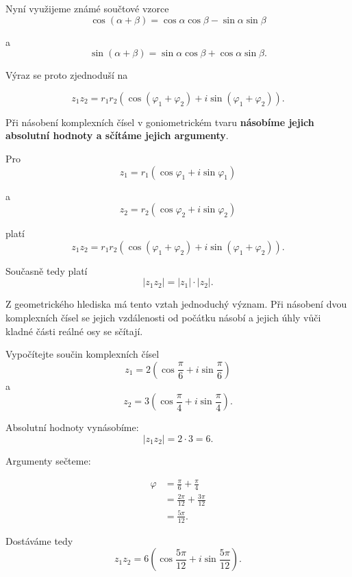 \documentclass[12pt,a4paper]{article}
\begin{document}
Nyní využijeme známé součtové vzorce
\[
    \cos(\alpha+\beta) = \cos\alpha\cos\beta - \sin\alpha\sin\beta
\]

a
\[
    \sin(\alpha+\beta) = \sin\alpha\cos\beta + \cos\alpha\sin\beta.
\]

Výraz se proto zjednoduší na

\[
    z_1z_2 = r_1r_2 \left(
                        \cos(\varphi_1+\varphi_2)
                        +
                        i\sin(\varphi_1+\varphi_2)
                    \right).
\]

\begin{notebox}
    Při násobení komplexních čísel v goniometrickém tvaru
    \textbf{násobíme jejich absolutní hodnoty a sčítáme jejich argumenty}.

    Pro
    \[
        z_1 = r_1 \left(\cos\varphi_1+i\sin\varphi_1\right)
    \]

    a
    \[
        z_2 = r_2 \left(\cos\varphi_2+i\sin\varphi_2\right)
    \]

    platí
    \[
        z_1z_2 = r_1r_2 \left(
                            \cos(\varphi_1+\varphi_2)
                            +
                            i\sin(\varphi_1+\varphi_2)
                        \right).
    \]

    Současně tedy platí
    \[
        |z_1z_2| = |z_1|\cdot|z_2|.
    \]
\end{notebox}

Z geometrického hlediska má tento vztah jednoduchý význam. 
Při násobení dvou komplexních čísel se jejich vzdálenosti od počátku násobí 
a jejich úhly vůči kladné části reálné osy se sčítají.

\begin{examplebox}
    Vypočítejte součin komplexních čísel
    \[
        z_1 = 2 \left(
                    \cos\frac{\pi}{6}
                    +
                    i\sin\frac{\pi}{6}
                \right)
    \]
    a
    \[
        z_2 = 3 \left(
                    \cos\frac{\pi}{4}
                    +
                    i\sin\frac{\pi}{4}
                \right).
    \]

    Absolutní hodnoty vynásobíme:
    \[
        |z_1z_2| = 2 \cdot 3 = 6.
    \]

    Argumenty sečteme:

    \begin{align*}
        \varphi &= \frac{\pi}{6} + \frac{\pi}{4}\\
                &= \frac{2\pi}{12} + \frac{3\pi}{12}\\
                &= \frac{5\pi}{12}.
    \end{align*}

    Dostáváme tedy
    \[
        z_1z_2 = 6  \left(
                        \cos\frac{5\pi}{12}
                        +
                        i\sin\frac{5\pi}{12}
                    \right).
    \]          
\end{examplebox}
\end{document}
